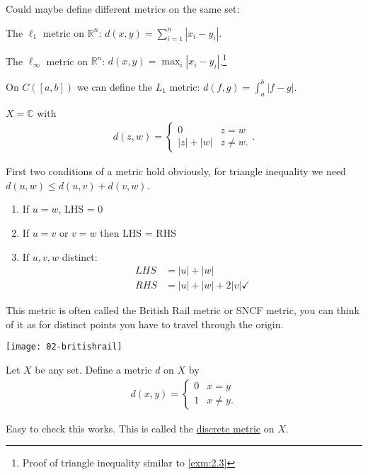 Could maybe define different metrics on the same set:
\begin{example}
    The $\ell_1$ metric on $\mathbb{R}^n$: $d(x, y) = \sum_{i=1}^{n} |x_i - y_i|$.
\end{example} 

\begin{example}
    The $\ell_\infty$ metric on $\mathbb{R}^n$: $d(x, y) = \max_{i} |x_i - y_i|$.\footnote{Proof of triangle inequality similar to \cref{exm:2.3}}
\end{example} 

\begin{example}
    On $C([a, b])$ we can define the $L_1$ metric: $d(f, g) = \int_a^b |f-g|$.
\end{example} 

\begin{example}
    $X = \mathbb{C}$ with 
    \begin{align*}
        d(z, w) = \begin{cases}
            0 & z = w \\
            |z| + |w| & z \neq w.
        \end{cases}.
    \end{align*}

    First two conditions of a metric hold obviously, for triangle inequality we need $d(u, w) \leq d(u, v) + d(v, w)$.

    \begin{enumerate}
        \item If $u = w$, LHS = 0 \checkmark
        \item If $u = v$ or $v = w$ then LHS = RHS \checkmark
        \item If $u, v, w$ distinct:
        \begin{align*}
            LHS &= |u| + |w| \\
            RHS &= |u| + |w| + 2|v| \checkmark
        \end{align*} 
    \end{enumerate} 

    This metric is often called the British Rail metric or SNCF metric, you can think of it as for distinct points you have to travel through the origin.
    {\par 
\centering 
\texttt{[image: 02-britishrail]} 
    \par}
\end{example} 

\begin{example} \label{exm:discrete}
    Let $X$ be any set.
    Define a metric $d$ on $X$ by
    \begin{align*}
        d(x, y) = \begin{cases}
            0 & x = y \\
            1 & x \neq y.
        \end{cases} 
    \end{align*} 

    Easy to check this works.
    This is called the \underline{discrete metric} on $X$.
\end{example} 

